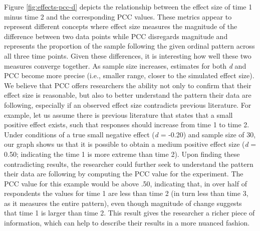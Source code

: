\documentclass[,man, mask]{apa6}
\theoremstyle{definition}
\theoremstyle{definition}
\theoremstyle{definition}
\theoremstyle{remark}
\begin{document}
Figure \ref{fig:effects-pcc-d} depicts the relationship between the
effect size of time 1 minus time 2 and the corresponding PCC values.
These metrics appear to represent different concepts where effect size
measures the magnitude of the difference between two data points while
PCC disregards magnitude and represents the proportion of the sample
following the given ordinal pattern across all three time points. Given
these differences, it is interesting how well these two measures
converge together. As sample size increases, estimates for both \emph{d}
and PCC become more precise (i.e., smaller range, closer to the
simulated effect size). We believe that PCC offers researchers the
ability not only to confirm that their effect size is reasonable, but
also to better understand the pattern their data are following,
especially if an observed effect size contradicts previous literature.
For example, let us assume there is previous literature that states that
a small positive effect exists, such that responses should increase from
time 1 to time 2. Under conditions of a true small negative effect
(\emph{d} = -0.20) and sample size of 30, our graph shows us that it is
possible to obtain a medium positive effect size (\emph{d} = 0.50;
indicating the time 1 is more extreme than time 2). Upon finding these
contradicting results, the researcher could further seek to understand
the pattern their data are following by computing the PCC value for the
experiment. The PCC value for this example would be above .50,
indicating that, in over half of respondents the values for time 1 are
less than time 2 (in turn less than time 3, as it measures the entire
pattern), even though magnitude of change suggests that time 1 is larger
than time 2. This result gives the researcher a richer piece of
information, which can help to describe their results in a more nuanced
fashion.
\end{document}
